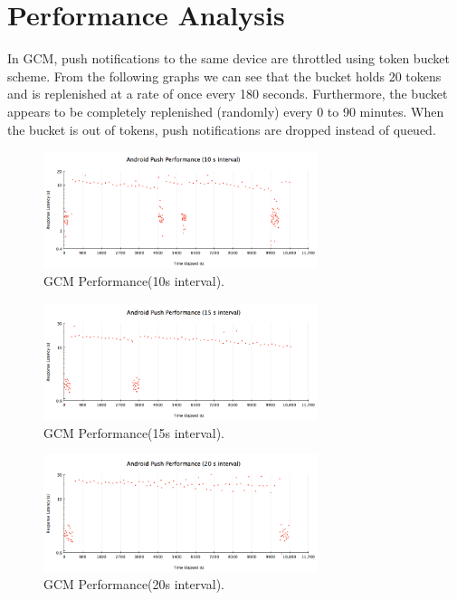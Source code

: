 \section{Performance Analysis}
In GCM, push notifications to the same device are throttled using token bucket scheme. From the following graphs we can see that the bucket holds 20 tokens and is replenished at a rate of once every 180 seconds. Furthermore, the bucket appears to be completely replenished (randomly) every 0 to 90 minutes. When the bucket is out of tokens, push notifications are dropped instead of queued.
\begin{figure}[h]
\centering
\includegraphics[width=8cm]{images/graph1.png}
\caption{\label{fig:g1}GCM Performance(10s interval).}
\end{figure}
\begin{figure}[h]
\centering
\includegraphics[width=8cm]{images/graph2.png}
\caption{\label{fig:g2}GCM Performance(15s interval).}
\end{figure}
\begin{figure}[h]
\centering
\includegraphics[width=8cm]{images/graph3.png}
\caption{\label{fig:g3}GCM Performance(20s interval).}
\end{figure}
